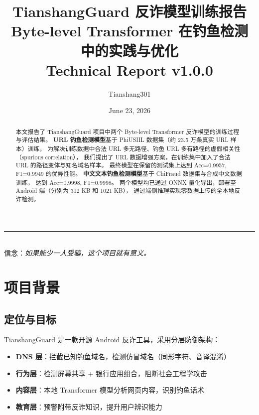 \documentclass[11pt,a4paper]{article}
\title{\vspace{-2cm}
  {\LARGE\bfseries\color{primaryblue} TianshangGuard 反诈模型训练报告}\\[0.3cm]
  {\large Byte-level Transformer 在钓鱼检测中的实践与优化}\\[0.2cm]
  {\normalsize Technical Report v1.0.0}
}
\author{Tianshang301}
\date{June 23, 2026}
\begin{document}
\maketitle
\thispagestyle{empty}

\begin{center}
\rule{0.618\textwidth}{0.5pt}\\[0.3cm]
{\small 信念：\textit{如果能少一人受骗，这个项目就有意义。}}
\end{center}

\vspace{0.5cm}

\begin{abstract}
本文报告了 TianshangGuard 项目中两个 Byte-level Transformer 反诈模型的训练过程与评估结果。
\textbf{URL 钓鱼检测模型}基于 PhiUSIIL 数据集（约 23.5 万条真实 URL 样本）训练，
为解决训练数据中合法 URL 多无路径、钓鱼 URL 多有路径的虚假相关性（spurious correlation），
我们提出了 URL 数据增强方案，在训练集中加入了合法 URL 的路径变体与知名域名样本。
最终模型在保留的测试集上达到 Acc=0.9957, F1=0.9949 的优异性能。
\textbf{中文文本钓鱼检测模型}基于 ChiFraud 数据集与合成中文数据训练，
达到 Acc=0.9998, F1=0.9998。
两个模型均已通过 ONNX 量化导出，部署至 Android 端（分别为 312 KB 和 1021 KB），
通过端侧推理实现零数据上传的全本地反诈检测。
\end{abstract}

\tableofcontents
\newpage

\section{项目背景}

\subsection{定位与目标}

TianshangGuard 是一款开源 Android 反诈工具，采用分层防御架构：
\begin{itemize}
  \item \textbf{DNS 层}：拦截已知钓鱼域名，检测仿冒域名（同形字符、音译混淆）
  \item \textbf{行为层}：检测屏幕共享 + 银行应用组合，阻断社会工程学攻击
  \item \textbf{内容层}：本地 Transformer 模型分析网页内容，识别钓鱼话术
  \item \textbf{教育层}：预警附带反诈知识，提升用户辨识能力
\end{itemize}
\end{document}

